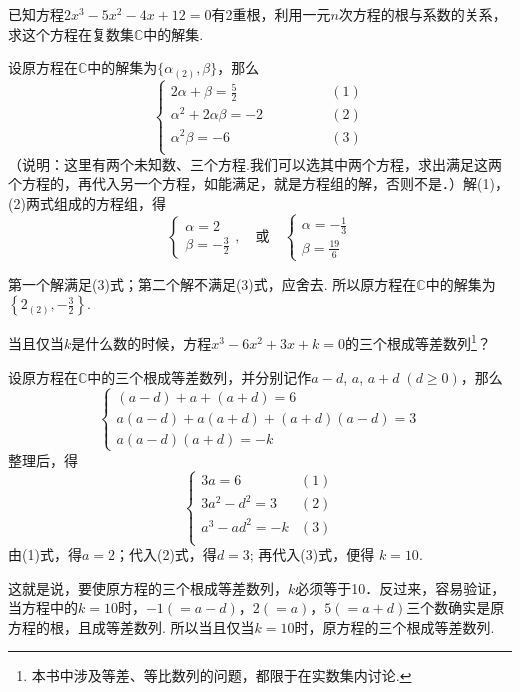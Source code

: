 \begin{example}
    已知方程$2x^3-5x^2-4x+12=0$有2重根，利用一元$n$次方程的根与系数的关系，求这个方程在复数集$\mathbb{C}$中的解集.
\end{example}

\begin{solution}
设原方程在$\mathbb{C}$中的解集为$\{\alpha_{(2)},\beta\}$，那么
\[\begin{cases}
    2\alpha +\beta =\frac{5}{2} & \qquad\qquad (1)\\
    \alpha^2 +2\alpha \beta =-2 & \qquad\qquad (2)\\
    \alpha^2 \beta =-6 & \qquad\qquad (3)\\
\end{cases}\]
（说明：这里有两个未知数、三个方程.我们可以选其中两个方程，求出满足这两个方程的，再代入另一个方程，如能满足，就是方程组的解，否则不是．）解(1)，(2)两式组成的方程组，得
\[\begin{cases}
    \alpha=2\\ \beta =-\frac{3}{2}
\end{cases},\quad \text{或} \quad \begin{cases}
    \alpha=-\frac{1}{3}\\[1ex] \beta=\frac{19}{6}
\end{cases}\]

第一个解满足(3)式；第二个解不满足(3)式，应舍去. 所以原方程在$\mathbb{C}$中的解集为$\left\{2_{(2)},-\frac{3}{2}\right\}$.
\end{solution}

\begin{example}
    当且仅当$k$是什么数的时候，方程$x^3-6x^2+3x+k=0$的三个根成等差数列\footnote{本书中涉及等差、等比数列的问题，都限于在实数集内讨论.}？
\end{example}

\begin{solution}
设原方程在$\mathbb{C}$中的三个根成等差数列，并分别记作$a-d$, $a$, $a+d\; (d\ge 0)$，那么
\[\begin{cases}
    (a-d)+a+(a+d)=6\\
    a(a-d)+a(a+d)+(a+d)(a-d)=3\\
    a(a-d)(a+d)=-k
\end{cases}\]
整理后，得
\[\begin{cases}
    3a=6& (1)\\
    3a^2-d^2=3& (2)\\
    a^3-ad^2=-k & (3)\\
\end{cases}\]
由(1)式，得$a=2$；代入(2)式，得$d=3$; 再代入(3)式，便得
$k=10$.

这就是说，要使原方程的三个根成等差数列，$k$必须等于10．反过来，容易验证，当方程中的$k=10$时，$-1(=a-d)$，$2(=a)$，$5(=a+d)$三个数确实是原方程的根，且成等差数列. 所以当且仅当$k=10$时，原方程的三个根成等差数列.
\end{solution}

